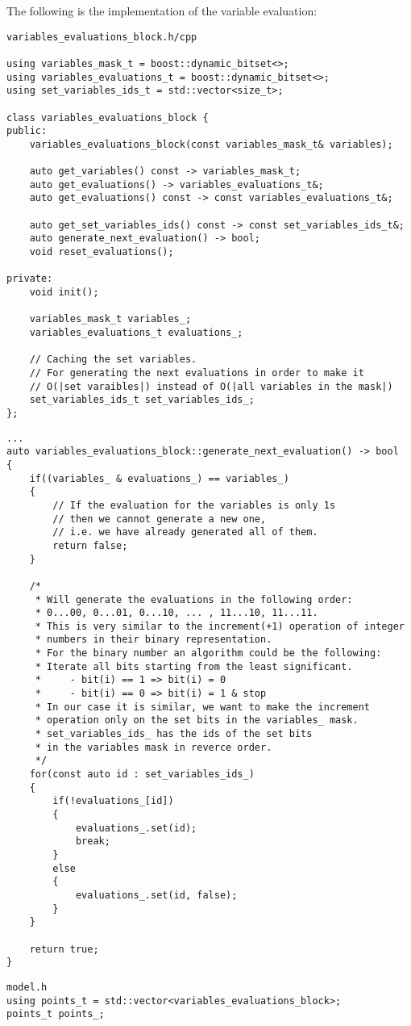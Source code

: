 \documentclass{article}
\begin{document}
	The following is the implementation of the variable evaluation:
\newpage
\begin{lstlisting}
variables_evaluations_block.h/cpp

using variables_mask_t = boost::dynamic_bitset<>;
using variables_evaluations_t = boost::dynamic_bitset<>;
using set_variables_ids_t = std::vector<size_t>;

class variables_evaluations_block {
public:
    variables_evaluations_block(const variables_mask_t& variables);

    auto get_variables() const -> variables_mask_t;
    auto get_evaluations() -> variables_evaluations_t&;
    auto get_evaluations() const -> const variables_evaluations_t&;

    auto get_set_variables_ids() const -> const set_variables_ids_t&;
    auto generate_next_evaluation() -> bool;
    void reset_evaluations();

private:
    void init();

    variables_mask_t variables_;
    variables_evaluations_t evaluations_;

    // Caching the set variables.
    // For generating the next evaluations in order to make it
    // O(|set varaibles|) instead of O(|all variables in the mask|)
    set_variables_ids_t set_variables_ids_;
};
\end{lstlisting}
\newpage
\begin{lstlisting}
...
auto variables_evaluations_block::generate_next_evaluation() -> bool
{
    if((variables_ & evaluations_) == variables_)
    {
        // If the evaluation for the variables is only 1s
        // then we cannot generate a new one,
        // i.e. we have already generated all of them.
        return false;
    }

    /*
     * Will generate the evaluations in the following order:
     * 0...00, 0...01, 0...10, ... , 11...10, 11...11.
     * This is very similar to the increment(+1) operation of integer
     * numbers in their binary representation.
     * For the binary number an algorithm could be the following:
     * Iterate all bits starting from the least significant.
     *     - bit(i) == 1 => bit(i) = 0
     *     - bit(i) == 0 => bit(i) = 1 & stop
     * In our case it is similar, we want to make the increment
     * operation only on the set bits in the variables_ mask.
     * set_variables_ids_ has the ids of the set bits
     * in the variables mask in reverce order.
     */
    for(const auto id : set_variables_ids_)
    {
        if(!evaluations_[id])
        {
            evaluations_.set(id);
            break;
        }
        else
        {
            evaluations_.set(id, false);
        }
    }

    return true;
}
\end{lstlisting}
\begin{lstlisting}
model.h
using points_t = std::vector<variables_evaluations_block>;
points_t points_;
\end{lstlisting}
\end{document}
